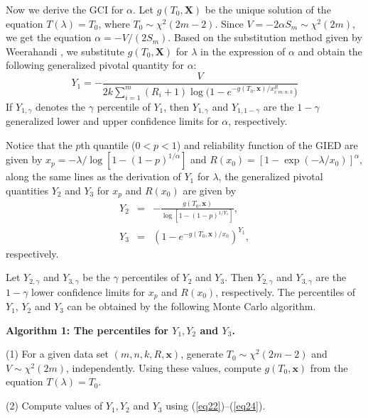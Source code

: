 \documentclass[12pt]{article}
\begin{document}

Now we derive the GCI for $\alpha$. Let $g(T_0,\textbf{X})$ be the unique solution of the equation $T(\lambda)=T_0$, where $T_0\sim \chi^2(2m-2)$.
Since $V=-2\alpha S_m\sim \chi^2(2m)$, we get the equation $\alpha=-V/(2S_m)$. Based on the substitution method given by Weerahandi \cite{weerahandi2004generalized}, we substitute $g(T_0,\textbf{X})$ for $\lambda$ in the expression of $\alpha$ and obtain the following generalized pivotal quantity for $\alpha$:
\begin{equation}\label{eq22}
Y_1=-\frac{V}{2k\sum_{i=1}^m(R_i+1)\log({1-e^{{-g(T_0,\textbf{x})}/{x_{i:m:n:k}^R}})}}
\end{equation}
If $Y_{1,\gamma}$ denotes the $\gamma$ percentile of $Y_1$, then $Y_{1,\gamma}$ and $Y_{1,1-\gamma}$ are the $1-\gamma$ generalized lower and upper confidence limits for $\alpha$, respectively.

Notice that the $p$th quantile ($0 < p < 1$) and reliability function of the GIED are given by $x_p=-\lambda/\log{[1-(1-p)^{1/\alpha}]}$ and
$R(x_0)=\left[1-\exp\left({-\lambda/x_0}\right)\right]^\alpha$, along the same lines as the derivation
of $Y_1$ for $\lambda$, the generalized pivotal quantities $Y_2$ and $Y_3$ for $x_p$ and $R(x_0)$ are given by
\begin{eqnarray}
Y_2&=&-\frac{g(T_0,\textbf{x})}{\log{\left[1-(1-p)^{1/{Y_1}}\right]}},\label{eq23}\\
Y_3&=&\left(1-e^{-g(T_0,\textbf{x})/x_0}\right)^{Y_1},\label{eq24}
\end{eqnarray}
respectively.

Let $Y_{2,\gamma}$ and $Y_{3,\gamma}$ be the $\gamma$ percentiles of $Y_2$ and $Y_3$. Then $Y_{2,\gamma}$ and $Y_{3,\gamma}$ are the $1-\gamma$ lower confidence limits for $x_p$ and $R(x_0)$, respectively.
The percentiles of $Y_1$, $Y_2$ and $Y_3$ can be obtained by the following Monte Carlo algorithm.

{\bf Algorithm 1: The percentiles for $Y_1, Y_2$ and $Y_3$.}

(1) For a given data set $(m, n, k, R, \textbf{x})$, generate $T_0 \sim \chi^2(2m-2)$ and $ V
\sim \chi^2(2m)$, independently. Using these values, compute $g(T_0,\textbf{x})$ from the equation $T(\lambda)=T_0$.

(2) Compute values of $Y_1, Y_2$ and $Y_3$ using (\ref{eq22})--(\ref{eq24}).
\end{document}
